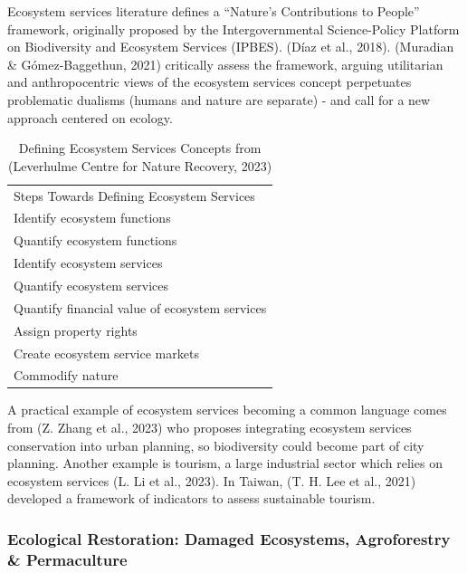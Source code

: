\documentclass[
  12pt,
  letterpaper,
  DIV=11,
  numbers=noendperiod]{scrartcl}
\begin{document}
Ecosystem services literature defines a ``Nature's Contributions to
People'' framework, originally proposed by the Intergovernmental
Science-Policy Platform on Biodiversity and Ecosystem Services (IPBES).
(Díaz et al., 2018). (Muradian \& Gómez-Baggethun, 2021) critically
assess the framework, arguing utilitarian and anthropocentric views of
the ecosystem services concept perpetuates problematic dualisms (humans
and nature are separate) - and call for a new approach centered on
ecology.

\def\pandoctableshortcapt{Defining Ecosystem Services Concepts}

\begin{longtable}[]{@{}l@{}}
\caption[Defining Ecosystem Services Concepts]{Defining Ecosystem
Services Concepts from (Leverhulme Centre for Nature Recovery,
2023)}\tabularnewline
\toprule\noalign{}
\endfirsthead
\endhead
\bottomrule\noalign{}
\endlastfoot
9 Steps Towards Defining Ecosystem Services \\
Identify ecosystem functions \\
Quantify ecosystem functions \\
Identify ecosystem services \\
Quantify ecosystem services \\
Quantify financial value of ecosystem services \\
Assign property rights \\
Create ecosystem service markets \\
Commodify nature \\
\end{longtable}

\let\pandoctableshortcapt\relax

A practical example of ecosystem services becoming a common language
comes from (Z. Zhang et al., 2023) who proposes integrating ecosystem
services conservation into urban planning, so biodiversity could become
part of city planning. Another example is tourism, a large industrial
sector which relies on ecosystem services (L. Li et al., 2023). In
Taiwan, (T. H. Lee et al., 2021) developed a framework of indicators to
assess sustainable tourism.

\subsubsection{Ecological Restoration: Damaged Ecosystems, Agroforestry
\&
Permaculture}\label{ecological-restoration-damaged-ecosystems-agroforestry-permaculture}
\end{document}
